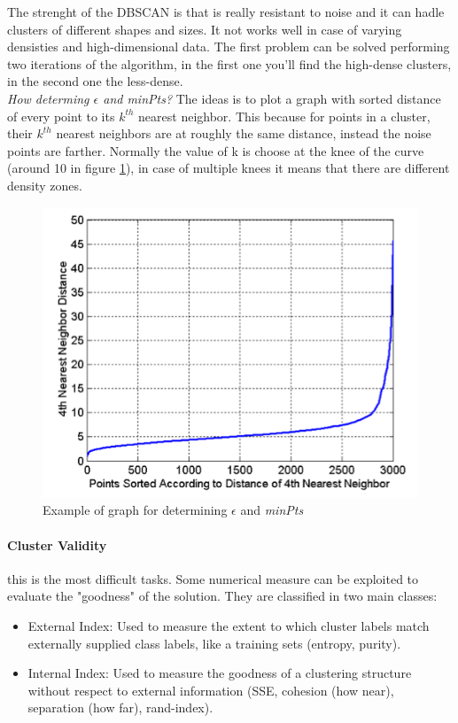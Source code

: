 \documentclass[12pt]{article}
\begin{document}
The strenght of the DBSCAN is that is really resistant to noise and it can hadle clusters of different shapes and sizes. It not works well in case of varying densisties and high-dimensional data. The first problem can be solved performing two iterations of the algorithm, in the first one you'll find the high-dense clusters, in the second one the less-dense.\\
\textit{How determing $\epsilon$ and minPts?} The ideas is to plot a graph with sorted distance of every point to its $k^{th}$ nearest neighbor. This because for points in a cluster, their $k^{th}$ nearest neighbors are at roughly the same distance, instead the noise points are farther. Normally the value of k is choose at the knee of the curve (around 10 in figure \ref{fig:knee}), in case of multiple knees it means that there are different density zones.
\begin{figure}[H]
  \centering
  \includegraphics[width=0.8\linewidth]{images/knee.png}
  \caption{Example of graph for determining $\epsilon$ and \textit{minPts}}
  \label{fig:knee}
\end{figure}

\paragraph{Cluster Validity} this is the most difficult tasks. Some numerical measure can be exploited to evaluate the "goodness" of the solution. They are classified in two main classes:
\begin{itemize}
  \item External Index: Used to measure the extent to which cluster labels match externally supplied class labels, like a training sets (entropy, purity).
  \item Internal Index: Used to measure the goodness of a clustering structure without respect to external information (SSE, cohesion (how near), separation (how far), rand-index).
\end{itemize}
\end{document}
